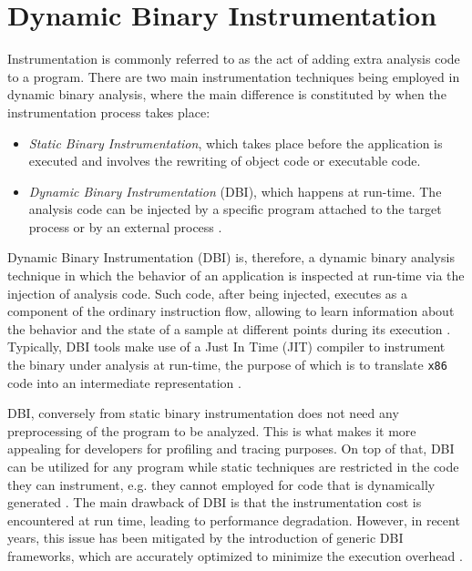\section{Dynamic Binary Instrumentation}

Instrumentation is commonly referred to as the act of adding extra analysis code to a program. There are two main instrumentation techniques being employed in dynamic binary analysis, where the main difference is constituted by when the instrumentation process takes place:

\begin{itemize}
\item \textit{Static Binary Instrumentation}, which takes place before the application is executed and involves the rewriting of object code or executable code.
\item \textit{Dynamic Binary Instrumentation} (DBI), 	which happens at run-time. The analysis code can be injected by a specific program attached to the target process or by an external process \cite{Nethercote2004CI}. 
\end{itemize}   

Dynamic Binary Instrumentation (DBI) is, therefore, a dynamic binary analysis technique in which the behavior of an application is inspected at run-time via the injection of analysis code. Such code, after being injected, executes as a component of the ordinary instruction flow, allowing to learn information about the behavior and the state of a sample at different points during its execution \cite{DBI}. Typically, DBI tools make use of a Just In Time (JIT) compiler to instrument the binary under analysis at run-time, the purpose of which is to translate \texttt{x86} code into an intermediate representation \cite{polino_arancino_2017}.

DBI, conversely from static binary instrumentation does not need any preprocessing of the program to be analyzed. This is what makes it more appealing for developers for profiling and tracing purposes. On top of that, DBI can be utilized for any program while static techniques are restricted in the code they can instrument, e.g. they cannot employed for code that is dynamically generated \cite{6658603}. The main drawback of DBI is that the instrumentation cost is encountered at run time, leading to performance degradation. However, in recent years, this issue has been mitigated by the introduction of generic DBI frameworks, which are accurately optimized to minimize the execution overhead \cite{Nethercote2004CI}.

